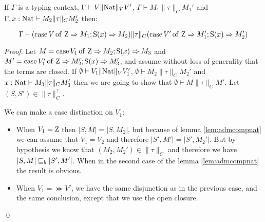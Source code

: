 \begin{lemma}
    If $\Gamma$ is a typing context, 
    $\Gamma \vdash V \| \textnormal{Nat} \|_V V'$,
    $\Gamma \vdash M_1 \| \tau \|_C M_1'$
    and $\Gamma, x:\textnormal{Nat} \vdash M_2 \| \tau \|_C M_2'$
    then:

    \begin{equation*}
        \Gamma \vdash (\operatorname{case} V \operatorname{of} \, \textnormal{Z} \Rightarrow M_1; \operatorname{S}(x) \Rightarrow M_2) \| \tau \|_C
            (\operatorname{case} V' \operatorname{of} \, \textnormal{Z} \Rightarrow M_1'; \operatorname{S}(x) \Rightarrow M_2')
    \end{equation*}
\end{lemma}
\begin{proof}
Let $M = \operatorname{case} V_1 \operatorname{of} \, \textnormal{Z} \Rightarrow M_2; \operatorname{S}(x) \Rightarrow M_3$ and $M' = \operatorname{case} V_1' \operatorname{of} \, \textnormal{Z} \Rightarrow M_2'; \operatorname{S}(x) \Rightarrow M_3'$,
and assume without loss of generality that the terms are closed. 
If $\emptyset \vdash V_1 \| \textnormal{Nat} \|_V V_1'$, 
$\emptyset \vdash M_2 \| \tau \|_C M_2'$
and $ x: \textnormal{Nat} \vdash M_3 \| \tau \|_C M_3'$ 
then we are going to show that $\emptyset \vdash M \| \tau \|_C M'$.
Let $(S,S') \in \| \tau \|_C^\top$.

We can make a case distinction on $V_1$:
\begin{itemize}
    \item When $V_1 = \textnormal{Z}$ then $|S,M| = |S,M_2|$,
        but because of lemma \ref{lem:admcompnat} 
        we can assume that $V_1 = V_2$ and therefore 
        $|S',M'| = |S', M_2'|$. But by hypothesis
        we know that $(M_2,M_2') \in \| \tau \|_C$ and therefore
        we have $| S, M| \sqsubseteq_b |S',M'|$. When in the second 
        case of the lemma \ref{lem:admcompnat} 
        the result is obvious.

    \item When $V_1 = \Succ V'$, we have the same 
        disjunction as in the previous case, and 
        the same conclusion, except that we use 
        the open closure.
\end{itemize}
\qed\end{proof}



